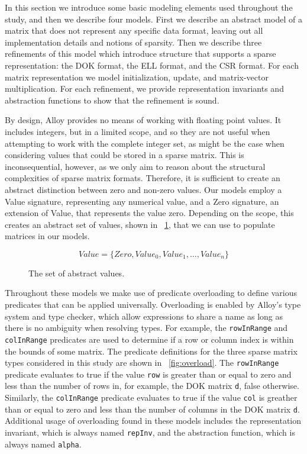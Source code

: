 \documentclass[11pt,conference]{IEEEtran}
\begin{document}
In this section we introduce some basic modeling elements used throughout the study, and then we describe four models.  First we describe an abstract model of a matrix that does not represent any specific data format, leaving out all implementation details and notions of sparsity. Then we describe three refinements of this model which introduce structure that supports a sparse representation: the DOK format, the ELL format, and the CSR format.  For each matrix representation we model initialization, update, and matrix-vector multiplication.  For each refinement, we provide representation invariants and abstraction functions to show that the refinement is sound.

By design, Alloy provides no means of working with floating point values.  It includes integers, but in a limited scope, and so they are not useful when attempting to work with the complete integer set, as might be the case when considering values that could be stored in a sparse matrix.  This is inconsequential, however, as we only aim to reason about the structural complexities of sparse matrix formats.  Therefore, it is sufficient to create an abstract distinction between zero and non-zero values.  Our models employ a Value signature, representing any numerical value, and a Zero signature, an extension of Value, that represents the value zero.  Depending on the scope, this creates an abstract set of values, shown in \figurename~\ref{fig:values}, that we can use to populate matrices in our models.

\begin{figure}
\begin{displaymath}
Value = \{Zero, Value_0, Value_1, \ldots, Value_n\}
\end{displaymath}
\caption{The set of abstract values.}
\label{fig:values}
\end{figure}

Throughout these models we make use of predicate overloading to define various predicates that can be applied universally.  Overloading is enabled by Alloy's type system and type checker, which allow expressions to share a name as long as there is no ambiguity when resolving types.  For example, the \texttt{rowInRange} and \texttt{colInRange} predicates are used to determine if a row or column index is within the bounds of some matrix.  The predicate definitions for the three sparse matrix types considered in this study are shown in \figurename~\ref{fig:overload}.  The \texttt{rowInRange} predicate evaluates to true if the value \texttt{row} is greater than or equal to zero and less than the number of rows in, for example, the DOK matrix \texttt{d}, false otherwise.  Similarly, the \texttt{colInRange} predicate evaluates to true if the value \texttt{col} is greather than or equal to zero and less than the number of columns in the DOK matrix \texttt{d}.  Additional usage of overloading found in these models includes the representation invariant, which is always named \texttt{repInv}, and the abstraction function, which is always named \texttt{alpha}.
\end{document}
